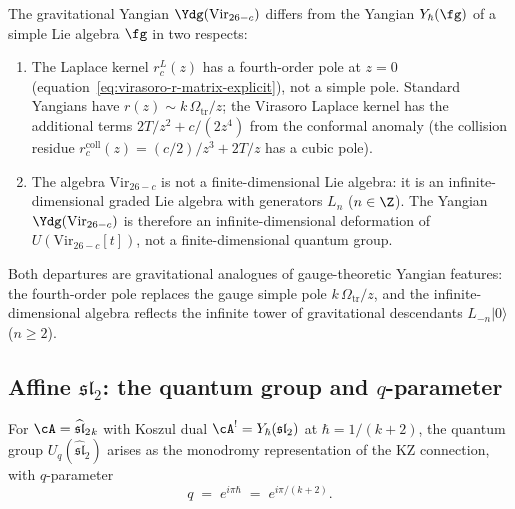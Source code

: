 \begin{remark}
The gravitational Yangian $\Ydg(\mathrm{Vir}_{26-c})$
differs from the Yangian $Y_\hbar(\fg)$ of a simple Lie
algebra $\fg$ in two respects:
\begin{enumerate}[label=(\roman*)]
\item The Laplace kernel $r^L_c(z)$ has a fourth-order pole
 at $z=0$ (equation~\eqref{eq:virasoro-r-matrix-explicit}),
 not a simple pole. Standard Yangians have
 $r(z)\sim k\,\Omega_{\mathrm{tr}}/z$; the Virasoro Laplace kernel has the
 additional terms $2T/z^2+c/(2z^4)$ from the conformal
 anomaly (the collision residue $r^{\mathrm{coll}}_c(z) =
 (c/2)/z^3 + 2T/z$ has a cubic pole).
\item The algebra $\mathrm{Vir}_{26-c}$ is not a
 finite-dimensional Lie algebra: it is an infinite-dimensional
 graded Lie algebra with generators $L_n$ ($n\in\Z$).
 The Yangian $\Ydg(\mathrm{Vir}_{26-c})$ is therefore
 an infinite-dimensional deformation of $U(\mathrm{Vir}_{26-c}[t])$,
 not a finite-dimensional quantum group.
\end{enumerate}
Both departures are gravitational analogues of gauge-theoretic
Yangian features: the fourth-order pole replaces the gauge
simple pole $k\,\Omega_{\mathrm{tr}}/z$, and the infinite-dimensional algebra
reflects the infinite tower of gravitational descendants
$L_{-n}|0\rangle$ ($n\ge 2$).
\end{remark}

\subsection{Affine $\mathfrak{sl}_2$: the quantum group
and $q$-parameter}

\begin{theorem}
For $\cA=\widehat{\mathfrak{sl}}_2{}_k$ with Koszul dual
$\cA^!=Y_\hbar(\mathfrak{sl}_2)$ at
$\hbar=1/(k+2)$, the quantum group
$U_q(\widehat{\mathfrak{sl}}_2)$ arises as the
monodromy representation of the KZ connection, with
$q$-parameter
\begin{equation}
q\;=\;e^{i\pi\hbar}\;=\;e^{i\pi/(k+2)}.
\end{equation}
\end{theorem}

